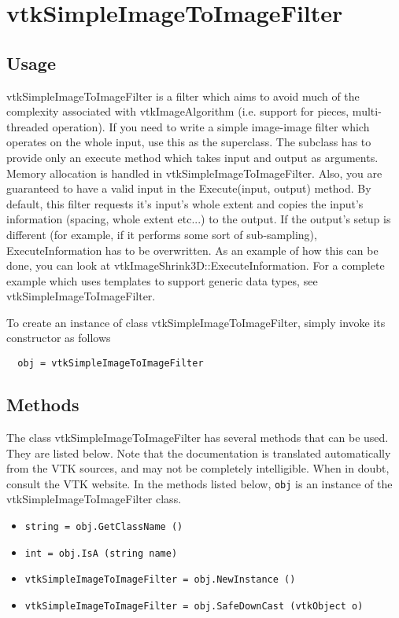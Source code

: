 \section{vtkSimpleImageToImageFilter}

\subsection{Usage}

 vtkSimpleImageToImageFilter is a filter which aims to avoid much
 of the complexity associated with vtkImageAlgorithm (i.e.
 support for pieces, multi-threaded operation). If you need to write
 a simple image-image filter which operates on the whole input, use
 this as the superclass. The subclass has to provide only an execute
 method which takes input and output as arguments. Memory allocation
 is handled in vtkSimpleImageToImageFilter. Also, you are guaranteed to
 have a valid input in the Execute(input, output) method. By default, 
 this filter
 requests it's input's whole extent and copies the input's information
 (spacing, whole extent etc...) to the output. If the output's setup
 is different (for example, if it performs some sort of sub-sampling),
 ExecuteInformation has to be overwritten. As an example of how this
 can be done, you can look at vtkImageShrink3D::ExecuteInformation.
 For a complete example which uses templates to support generic data
 types, see vtkSimpleImageToImageFilter.

To create an instance of class vtkSimpleImageToImageFilter, simply
invoke its constructor as follows
\begin{verbatim}
  obj = vtkSimpleImageToImageFilter
\end{verbatim}
\subsection{Methods}

The class vtkSimpleImageToImageFilter has several methods that can be used.
  They are listed below.
Note that the documentation is translated automatically from the VTK sources,
and may not be completely intelligible.  When in doubt, consult the VTK website.
In the methods listed below, \verb|obj| is an instance of the vtkSimpleImageToImageFilter class.
\begin{itemize}
\item  \verb|string = obj.GetClassName ()|

\item  \verb|int = obj.IsA (string name)|

\item  \verb|vtkSimpleImageToImageFilter = obj.NewInstance ()|

\item  \verb|vtkSimpleImageToImageFilter = obj.SafeDownCast (vtkObject o)|

\end{itemize}
